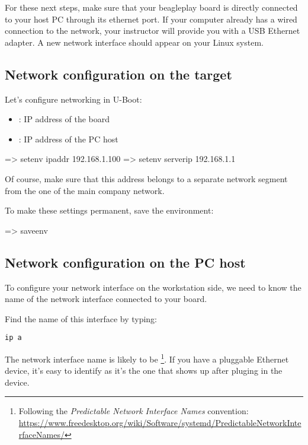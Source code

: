 For these next steps, make sure that your beagleplay board is directly connected
to your host PC through its ethernet port. If your computer already has a wired
connection to the network, your instructor will provide you with a USB Ethernet
adapter. A new network interface should appear on your Linux system.

\subsection{Network configuration on the target}

Let's configure networking in U-Boot:

\begin{itemize}
\item {}: IP address of the board
\item {}: IP address of the PC host
\end{itemize}

\begin{ubootinput}
=> setenv ipaddr 192.168.1.100
=> setenv serverip 192.168.1.1
\end{ubootinput}

Of course, make sure that this address belongs to a separate network
segment from the one of the main company network.

To make these settings permanent, save the environment:

\begin{ubootinput}
=> saveenv
\end{ubootinput}

\subsection{Network configuration on the PC host}

To configure your network interface on the workstation side, we need
to know the name of the network interface connected to your board.

Find the name of this interface by typing:

\begin{verbatim}
ip a
\end{verbatim}

The network interface name is likely to be
\footnote{Following the {\em Predictable Network Interface
Names} convention:
\url{https://www.freedesktop.org/wiki/Software/systemd/PredictableNetworkInterfaceNames/}}.
If you have a pluggable Ethernet device, it's easy to identify as it's
the one that shows up after pluging in the device.

